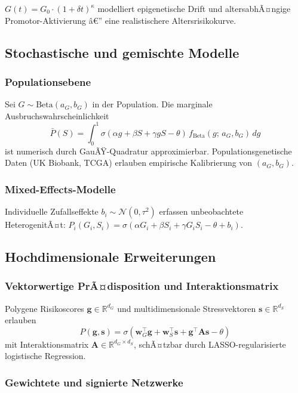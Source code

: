 ﻿\documentclass[12pt, a4paper]{article}
\theoremstyle{definition}
\theoremstyle{remark}
\newcommand{\R}{\mathbb{R}}
\begin{document}
$G(t) = G_0 \cdot (1+\delta t)^\kappa$ modelliert epigenetische Drift und
altersabhÃ¤ngige Promotor-Aktivierung â€” eine realistischere Altersrisikokurve.

\subsection{Stochastische und gemischte Modelle}

\subsubsection{Populationsebene}

Sei $G \sim \mathrm{Beta}(a_G, b_G)$ in der Population. Die marginale Ausbruchswahrscheinlichkeit
\[
  \bar{P}(S) = \int_0^1 \sigma(\alpha g + \beta S + \gamma g S - \theta)\,
  f_{\mathrm{Beta}}(g;\,a_G,b_G)\,dg
\]
ist numerisch durch GauÃŸ-Quadratur approximierbar. Populationsgenetische Daten
(UK Biobank, TCGA) erlauben empirische Kalibrierung von $(a_G, b_G)$.

\subsubsection{Mixed-Effects-Modelle}

Individuelle Zufallseffekte $b_i \sim \mathcal{N}(0,\tau^2)$ erfassen
unbeobachtete HeterogenitÃ¤t:
$P_i(G_i, S_i) = \sigma(\alpha G_i + \beta S_i + \gamma G_i S_i - \theta + b_i)$.

\subsection{Hochdimensionale Erweiterungen}

\subsubsection{Vektorwertige PrÃ¤disposition und Interaktionsmatrix}

Polygene Risikoscores $\mathbf{g} \in \R^{d_G}$ und multidimensionale
Stressvektoren $\mathbf{s} \in \R^{d_S}$ erlauben
\[
  P(\mathbf{g},\mathbf{s}) = \sigma(\mathbf{w}_G^\top \mathbf{g}
  + \mathbf{w}_S^\top \mathbf{s} + \mathbf{g}^\top \mathbf{A} \mathbf{s} - \theta)
\]
mit Interaktionsmatrix $\mathbf{A} \in \R^{d_G \times d_S}$,
schÃ¤tzbar durch LASSO-regularisierte logistische Regression.

\subsubsection{Gewichtete und signierte Netzwerke}
\end{document}
